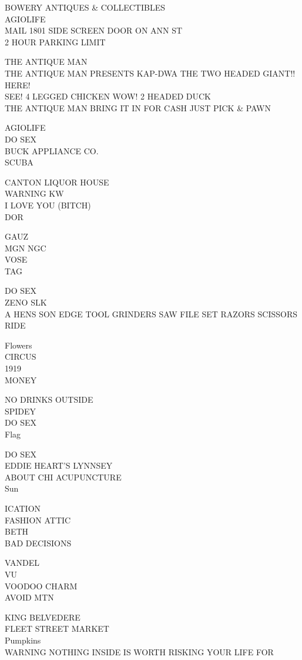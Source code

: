 \documentclass[10pt,letterpaper]{article}
\begin{document}
BOWERY ANTIQUES \& COLLECTIBLES\\
AGIOLIFE\\
MAIL 1801 SIDE SCREEN DOOR ON ANN ST\\
2 HOUR PARKING LIMIT

THE ANTIQUE MAN\\
THE ANTIQUE MAN PRESENTS KAP{-}DWA THE TWO HEADED GIANT!! HERE!\\
SEE! 4 LEGGED CHICKEN WOW! 2 HEADED DUCK\\
THE ANTIQUE MAN BRING IT IN FOR CASH JUST PICK \& PAWN

AGIOLIFE\\
DO SEX\\
BUCK APPLIANCE CO.\\
SCUBA

CANTON LIQUOR HOUSE\\
WARNING KW\\
I LOVE YOU (BITCH)\\
DOR

GAUZ\\
MGN NGC\\
VOSE\\
TAG

DO SEX\\
ZENO SLK\\
A HENS SON EDGE TOOL GRINDERS SAW FILE SET RAZORS SCISSORS\\
RIDE

Flowers\\
CIRCUS\\
1919\\
MONEY

NO DRINKS OUTSIDE\\
SPIDEY\\
DO SEX\\
Flag

DO SEX\\
EDDIE HEART'S LYNNSEY\\
ABOUT CHI ACUPUNCTURE\\
Sun

ICATION\\
FASHION ATTIC\\
BETH\\
BAD DECISIONS

VANDEL\\
VU\\
VOODOO CHARM\\
AVOID MTN

KING BELVEDERE\\
FLEET STREET MARKET\\
Pumpkins\\
WARNING NOTHING INSIDE IS WORTH RISKING YOUR LIFE FOR
\end{document}
